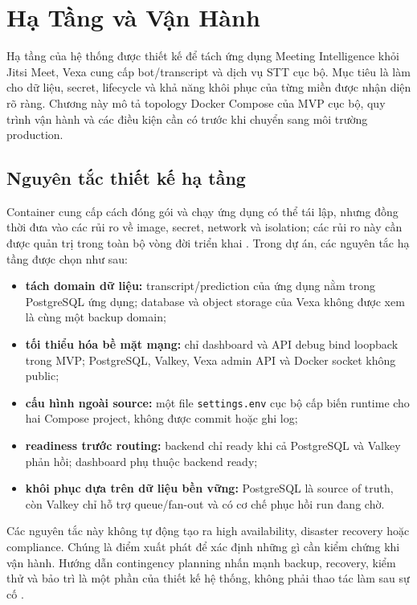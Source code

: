 \chapter{Hạ Tầng và Vận Hành}
\label{chap:infra}

Hạ tầng của hệ thống được thiết kế để tách ứng dụng Meeting Intelligence khỏi Jitsi Meet, Vexa cung cấp bot/transcript và dịch vụ STT cục bộ. Mục tiêu là làm cho dữ liệu, secret, lifecycle và khả năng khôi phục của từng miền được nhận diện rõ ràng. Chương này mô tả topology Docker Compose của MVP cục bộ, quy trình vận hành và các điều kiện cần có trước khi chuyển sang môi trường production.

\section{Nguyên tắc thiết kế hạ tầng}
Container cung cấp cách đóng gói và chạy ứng dụng có thể tái lập, nhưng đồng thời đưa vào các rủi ro về image, secret, network và isolation; các rủi ro này cần được quản trị trong toàn bộ vòng đời triển khai \cite{nist800190}. Trong dự án, các nguyên tắc hạ tầng được chọn như sau:
\begin{itemize}
  \item \textbf{tách domain dữ liệu:} transcript/prediction của ứng dụng nằm trong PostgreSQL ứng dụng; database và object storage của Vexa không được xem là cùng một backup domain;
  \item \textbf{tối thiểu hóa bề mặt mạng:} chỉ dashboard và API debug bind loopback trong MVP; PostgreSQL, Valkey, Vexa admin API và Docker socket không public;
  \item \textbf{cấu hình ngoài source:} một file \texttt{settings.env} cục bộ cấp biến runtime cho hai Compose project, không được commit hoặc ghi log;
  \item \textbf{readiness trước routing:} backend chỉ ready khi cả PostgreSQL và Valkey phản hồi; dashboard phụ thuộc backend ready;
  \item \textbf{khôi phục dựa trên dữ liệu bền vững:} PostgreSQL là source of truth, còn Valkey chỉ hỗ trợ queue/fan-out và có cơ chế phục hồi run đang chờ.
\end{itemize}

Các nguyên tắc này không tự động tạo ra high availability, disaster recovery hoặc compliance. Chúng là điểm xuất phát để xác định những gì cần kiểm chứng khi vận hành. Hướng dẫn contingency planning nhấn mạnh backup, recovery, kiểm thử và bảo trì là một phần của thiết kế hệ thống, không phải thao tác làm sau sự cố \cite{nist80034}.

